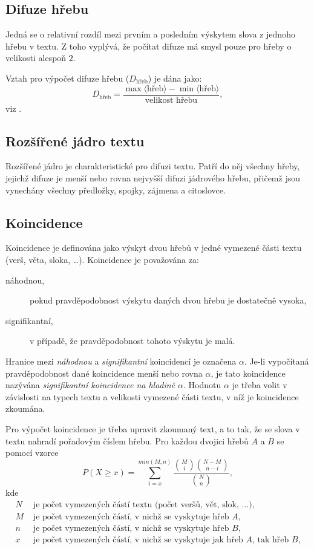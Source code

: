 \documentclass[dp.tex]{subfiles}
\begin{document}
\subsection{Difuze hřebu}
Jedná se o relativní rozdíl mezi prvním a posledním výskytem slova z jednoho hřebu v textu. Z toho vyplývá, že počítat difuze má smysl pouze pro hřeby o velikosti alespoň $2$.

Vztah pro výpočet difuze hřebu ($D_{\text{hřeb}}$) je dána jako:
\begin{equation}
D_\text{hřeb}=\frac{\max{\langle\text{hřeb}\rangle}-\min{\langle\text{hřeb}\rangle}}{\text{velikost hřebu}},
\end{equation}
viz \cite[str. 304]{Wimmer2003}.
\subsection{Rozšířené jádro textu}
Rozšířené jádro je charakteristické pro difuzi textu. Patří do něj všechny hřeby, jejichž difuze je menší nebo rovna nejvyšší difuzi jádrového hřebu, přičemž jsou vynechány všechny předložky, spojky, zájmena a citoslovce.

\subsection{Koincidence}
Koincidence je definována jako výskyt dvou hřebů v jedné vymezené části textu (verš, věta, sloka, \ldots). Koincidence je považována za:
\begin{description}
\item[náhodnou,] pokud pravděpodobnost výskytu daných dvou hřebu je dostatečně vysoka,
\item[signifikantní,] v případě, že pravděpodobnost tohoto výskytu je malá.
\end{description}

Hranice mezi \textit{náhodnou} a \textit{signifikantní} koincidencí je označena $\alpha $. Je-li vypočítaná pravděpodobnost dané koincidence menší nebo rovna $\alpha $, je tato koincidence nazývána \textit{signifikantní koincidence na hladině $\alpha $}. Hodnotu $\alpha $ je třeba volit v závislosti na typech textu a velikosti vymezené části textu, v níž je koincidence zkoumána.

Pro výpočet koincidence je třeba upravit zkoumaný text, a to tak, že se slova v textu nahradí pořadovým číslem hřebu. Pro každou dvojici hřebů $A$ a $B$ se pomocí vzorce
\begin{equation}
P(X \geq x)=\sum_{i=x}^{min{\left(  M, n \right) }} \frac{\binom{M}{i}\binom{N-M}{n-i}}{\binom{N}{n}},
\end{equation}
kde 
\begin{align*}
	N & \text{ je počet vymezených částí textu (počet veršů, vět, slok, \ldots),}\\
	M & \text{ je počet vymezených částí, v nichž se vyskytuje hřeb $A$,}\\
	n & \text{ je počet vymezených částí, v nichž se vyskytuje hřeb $B$,}\\
	x & \text{ je počet vymezených částí, v nichž se vyskytuje jak hřeb  $A$, tak hřeb $B$,}
\end{align*}  
\end{document}
